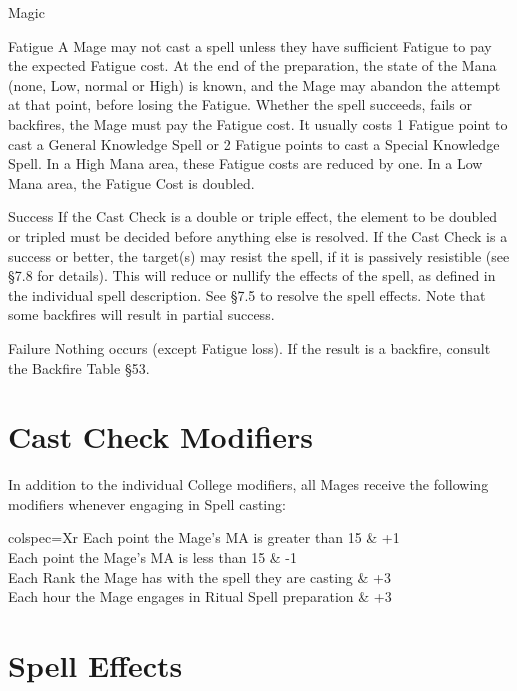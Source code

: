 \begin{Chapter}{Magic}
\begin{Description}
\item[Fatigue] A Mage may not cast a spell unless they have sufficient
  Fatigue to pay the expected Fatigue cost.  At the end of the
  preparation, the state of the Mana (none, Low, normal or High) is
  known, and the Mage may abandon the attempt at that point, before
  losing the Fatigue.  Whether the spell succeeds, fails or backfires,
  the Mage must pay the Fatigue cost.  It usually costs 1 Fatigue point
  to cast a General Knowledge Spell or 2 Fatigue points to cast a
  Special Knowledge Spell.  In a High Mana area, these Fatigue costs
  are reduced by one.  In a Low Mana area, the Fatigue Cost is
  doubled.

\item[Success] If the Cast Check is a double or triple effect, the
  element to be doubled or tripled must be decided before anything
  else is resolved.  If the Cast Check is a success or better, the
  target(s) may resist the spell, if it is passively resistible (see
  §7.8 for details).  This will reduce or nullify the effects of the
  spell, as defined in the individual spell description. See §7.5 to
  resolve the spell effects. Note that some backfires will result in
  partial success.

\item[Failure] Nothing occurs (except Fatigue loss).  If the result is
  a backfire, consult the Backfire Table §53.

\end{Description}


\section{Cast Check Modifiers}

In addition to the individual College modifiers, all Mages receive the
following modifiers whenever engaging in Spell casting:

\begin{dqtblr}{colspec={Xr}}
Each point the Mage’s MA is greater than 15		& +1 \\
Each point the Mage’s MA is less than 15		& -1 \\
Each Rank the Mage has with the spell they are casting	& +3 \\ 
Each hour the Mage engages in Ritual Spell preparation	& +3 \\
\end{dqtblr}


\section{Spell Effects}


\end{Chapter}
